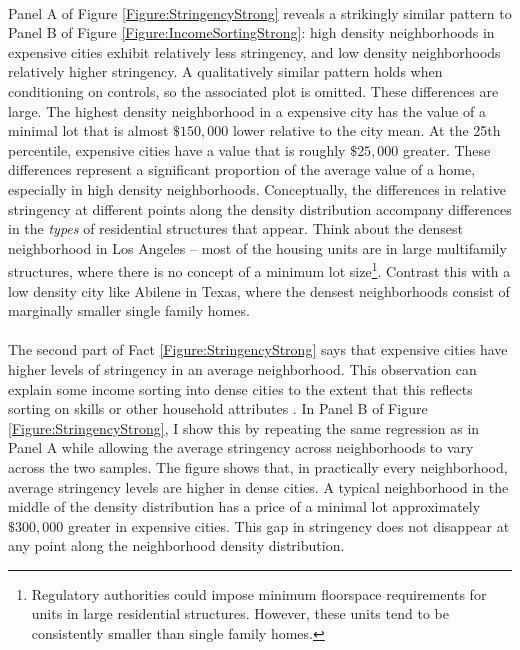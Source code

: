 \documentclass[11pt]{article}
\begin{document}
	\paragraph*{}
	Panel A of Figure \ref{Figure:StringencyStrong} reveals a strikingly similar pattern to Panel B of Figure \ref{Figure:IncomeSortingStrong}: high density neighborhoods in expensive cities exhibit relatively less stringency, and low density neighborhoods relatively higher stringency. A qualitatively similar pattern holds when conditioning on controls, so the associated plot is omitted. These differences are large. The highest density neighborhood in a expensive city has the value of a minimal lot that is almost $\$ 150,000$ lower relative to the city mean. At the 25th percentile, expensive cities have a value that is roughly $\$ 25,000$ greater. These differences represent a significant proportion of the average value of a home, especially in high density neighborhoods. Conceptually, the differences in relative stringency at different points along the density distribution accompany differences in the \textit{types} of residential structures that appear. Think about the densest neighborhood in Los Angeles -- most of the housing units are in large multifamily structures, where there is no concept of a minimum lot size\footnote{Regulatory authorities could impose minimum floorspace requirements for units in large residential structures. However, these units tend to be consistently smaller than single family homes.}. Contrast this with a low density city like Abilene in Texas, where the densest neighborhoods consist of marginally smaller single family homes. 
	
	\paragraph*{}
	The second part of Fact \ref{Figure:StringencyStrong} says that expensive cities have higher levels of stringency in an average neighborhood. This observation can explain some income sorting into dense cities to the extent that this reflects sorting on skills or other household attributes \citep{diamond2016, citysizewagegap}. In Panel B of Figure \ref{Figure:StringencyStrong}, I show this by repeating the same regression as in Panel A while allowing the average stringency across neighborhoods to vary across the two samples. The figure shows that, in practically every neighborhood, average stringency levels are higher in dense cities. A typical neighborhood in the middle of the density distribution has a price of a minimal lot approximately $\$300,000$ greater in expensive cities. This gap in stringency does not disappear at any point along the neighborhood density distribution.
\end{document}

